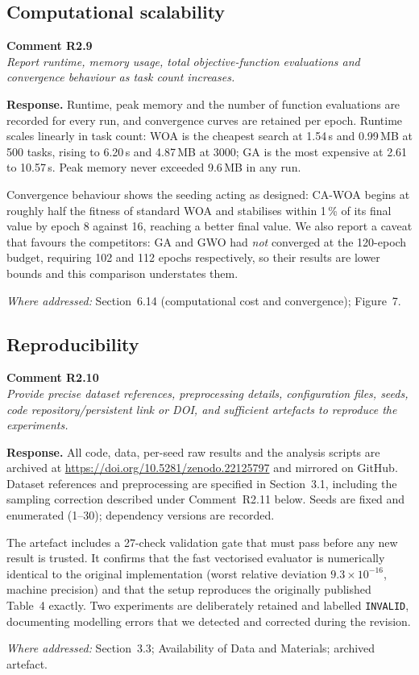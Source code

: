 \documentclass[11pt,a4paper]{article}
\newcommand{\rsp}[1]{\vspace{2pt}\noindent\textbf{Response.} #1\par\vspace{6pt}}
\newcommand{\rwhere}[1]{\noindent\textit{Where addressed:} #1\par\vspace{10pt}}
\newenvironment{revcomment}[1]
  {\begin{tcolorbox}[colback=gray!6,colframe=gray!45,boxrule=0.4pt,
     left=6pt,right=6pt,top=4pt,bottom=4pt]\textbf{#1}\\[2pt]\itshape\color{cmt}}
  {\end{tcolorbox}\vspace{4pt}}
\begin{document}
\subsection*{Computational scalability}
\begin{revcomment}{Comment R2.9}
Report runtime, memory usage, total objective-function evaluations and convergence
behaviour as task count increases.
\end{revcomment}
\rsp{Runtime, peak memory and the number of function evaluations are recorded for
every run, and convergence curves are retained per epoch. Runtime scales linearly
in task count: WOA is the cheapest search at 1.54\,s and 0.99\,MB at 500 tasks,
rising to 6.20\,s and 4.87\,MB at 3000; GA is the most expensive at 2.61 to
10.57\,s. Peak memory never exceeded 9.6\,MB in any run.

Convergence behaviour shows the seeding acting as designed: CA-WOA begins at
roughly half the fitness of standard WOA and stabilises within 1\,\% of its final
value by epoch 8 against 16, reaching a better final value. We also report a
caveat that favours the competitors: GA and GWO had \emph{not} converged at the
120-epoch budget, requiring 102 and 112 epochs respectively, so their results are
lower bounds and this comparison understates them.}
\rwhere{Section~6.14 (computational cost and convergence); Figure~7.}

\subsection*{Reproducibility}
\begin{revcomment}{Comment R2.10}
Provide precise dataset references, preprocessing details, configuration files,
seeds, code repository/persistent link or DOI, and sufficient artefacts to
reproduce the experiments.
\end{revcomment}
\rsp{All code, data, per-seed raw results and the analysis scripts are archived at
\url{https://doi.org/10.5281/zenodo.22125797} and mirrored on GitHub. Dataset
references and preprocessing are specified in Section~3.1, including the sampling
correction described under Comment~R2.11 below. Seeds are fixed and enumerated
(1--30); dependency versions are recorded.

The artefact includes a 27-check validation gate that must pass before any new
result is trusted. It confirms that the fast vectorised evaluator is numerically
identical to the original implementation (worst relative deviation
$9.3 \times 10^{-16}$, machine precision) and that the setup reproduces the
originally published Table~4 exactly. Two experiments are deliberately retained
and labelled \texttt{INVALID}, documenting modelling errors that we detected and
corrected during the revision.}
\rwhere{Section~3.3; Availability of Data and Materials; archived artefact.}
\end{document}
